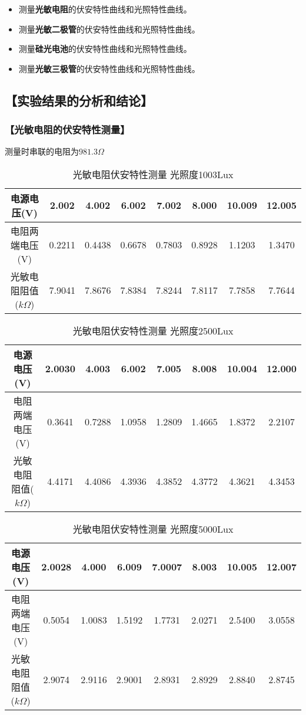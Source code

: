 \documentclass{ctexart}
\let\oldsubsection\subsection
\renewcommand{\subsection}[1]{\oldsubsection{\!\!\!\!\!\!【#1】}}
\let\oldsubsubsection\subsubsection
\renewcommand{\subsubsection}[1]{\oldsubsubsection{\!\!\!\!\!\!【#1】}}
\begin{document}
\begin{itemize}
\item 测量\textbf{光敏电阻}的伏安特性曲线和光照特性曲线。
\item 测量\textbf{光敏二极管}的伏安特性曲线和光照特性曲线。
\item 测量\textbf{硅光电池}的伏安特性曲线和光照特性曲线。
\item 测量\textbf{光敏三极管}的伏安特性曲线和光照特性曲线。
\end{itemize}

\subsection{实验结果的分析和结论}

\subsubsection{光敏电阻的伏安特性测量}

测量时串联的电阻为$981.3\Omega$

\begin{table}[H]
  \centering
  \begin{tabular}{|c|c|c|c|c|c|c|c|}
    \hline
    电源电压(V) &2.002&4.002&6.002&7.002&8.000&10.009&12.005\\\hline
    电阻两端电压(V) &0.2211&0.4438&0.6678&0.7803&0.8928&1.1203&1.3470\\\hline
    光敏电阻阻值($k\Omega$) &7.9041&7.8676&7.8384&7.8244&7.8117&7.7858&7.7644 \\\hline
  \end{tabular}
  \caption{光敏电阻伏安特性测量 光照度1003Lux}
\end{table}

\begin{table}[H]
  \centering
  \begin{tabular}{|c|c|c|c|c|c|c|c|}
    \hline
    电源电压(V) &2.0030&4.003&6.002&7.005&8.008&10.004&12.000\\\hline
    电阻两端电压(V) &0.3641&0.7288&1.0958&1.2809&1.4665&1.8372&2.2107\\\hline
    光敏电阻阻值($k\Omega$) &4.4171&4.4086&4.3936&4.3852&4.3772&4.3621&4.3453 \\\hline
  \end{tabular}
  \caption{光敏电阻伏安特性测量 光照度2500Lux}
\end{table}

\begin{table}[H]
  \centering
  \begin{tabular}{|c|c|c|c|c|c|c|c|}
    \hline
    电源电压(V) &2.0028&4.000&6.009&7.0007&8.003&10.005&12.007\\\hline
    电阻两端电压(V) &0.5054&1.0083&1.5192&1.7731&2.0271&2.5400&3.0558\\\hline
    光敏电阻阻值($k\Omega$) &2.9074&2.9116&2.9001&2.8931&2.8929&2.8840&2.8745 \\\hline
  \end{tabular}
  \caption{光敏电阻伏安特性测量 光照度5000Lux}
\end{table}
\end{document}
